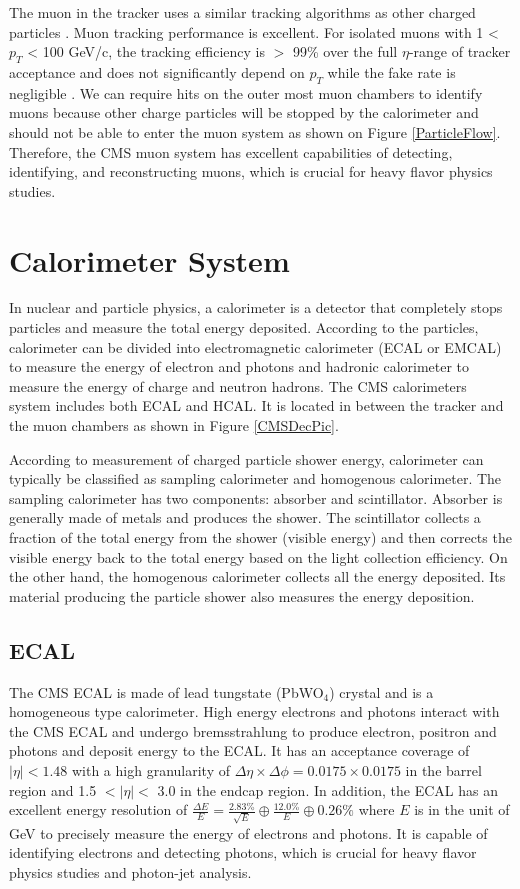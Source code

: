 The muon in the tracker uses a similar tracking algorithms as other charged particles \cite{CMSTrackComp}. Muon tracking performance is excellent. For isolated muons with 1 < $p_T$ < 100 GeV/c, the tracking efficiency is $>$ 99\% over the full $\eta$-range of tracker acceptance and does not significantly depend on $p_T$ while the fake rate is negligible \cite{CMSTrackComp}. We can require hits on the outer most muon chambers to identify muons because other charge particles will be stopped by the calorimeter and should not be able to enter the muon system as shown on Figure \ref{ParticleFlow}. Therefore, the CMS muon system has excellent capabilities of detecting, identifying, and reconstructing muons, which is crucial for heavy flavor physics studies. 

\section{Calorimeter System}

In nuclear and particle physics, a calorimeter is a detector that completely stops particles and measure the total energy deposited. According to the particles, calorimeter can be divided into electromagnetic calorimeter (ECAL or EMCAL) to measure the energy of electron and photons and hadronic calorimeter to measure the energy of charge and neutron hadrons. The CMS calorimeters system includes both ECAL and HCAL. It is located in between the tracker and the muon chambers as shown in Figure \ref{CMSDecPic}. 

According to measurement of charged particle shower energy, calorimeter can typically be classified as sampling calorimeter and homogenous calorimeter. The sampling calorimeter has two components: absorber and scintillator. Absorber is generally made of metals and produces the shower. The scintillator collects a fraction of the total energy from the shower (visible energy) and then corrects the visible energy back to the total energy based on the light collection efficiency. On the other hand, the homogenous calorimeter collects all the energy deposited. Its material producing the particle shower also measures the energy deposition. 

\subsection{ECAL}

The CMS ECAL is made of lead tungstate (PbWO$_4$) crystal and is a homogeneous type calorimeter. High energy electrons and photons interact with the CMS ECAL and undergo bremsstrahlung to produce electron, positron and photons and deposit energy to the ECAL. It has an acceptance coverage of $|\eta| < 1.48$ with a high granularity of $\Delta \eta \times \Delta \phi = 0.0175 \times 0.0175$ in the barrel region and 1.5 $< |\eta| <$ 3.0 in the endcap region. In addition, the ECAL has an excellent energy resolution of $\frac{\Delta E}{E} = \frac{2.83\%}{\sqrt {E}} \oplus \frac{12.0\%}{E}  \oplus 0.26\%$ where $E$ is in the unit of GeV \cite{ECALReso} to precisely measure the energy of electrons and photons. It is capable of identifying electrons and detecting photons, which is crucial for heavy flavor physics studies and photon-jet analysis. 

